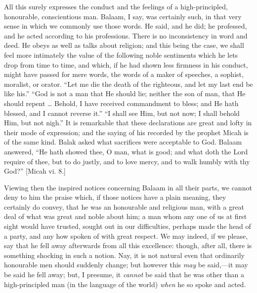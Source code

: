 All this surely expresses the conduct and the feelings of a
high-principled, honourable, conscientious man. Balaam, I say, was
certainly such, in that very sense in which we commonly use those
words. He said, and he did; he professed, and he acted according to
his professions. There is no inconsistency in word and deed. He obeys
as well as talks about religion; and this being the case, we shall
feel more intimately the value of the following noble sentiments which
he lets drop from time to time, and which, if he had shown less
firmness in his conduct, might have passed for mere words, the words
of a maker of speeches, a sophist, moralist, or orator. ``Let me
die the death of the righteous, and let my last end be like his.''
``God is not a man that He should lie; neither the son of man,
that He should repent … Behold, I have received commandment to
bless; and He hath blessed, and I cannot reverse it.'' ``I
shall see Him, but not now; I shall behold Him, but not nigh.'' It
is remarkable that these declarations are great and lofty in their
mode of expression; and the saying of his recorded by the prophet
Micah is of the same kind. Balak asked what sacrifices were acceptable
to God. Balaam answered, ``He hath showed thee, O man, what is
good; and what doth the Lord require of thee, but to do justly, and to
love mercy, and to walk humbly with thy God?'' [Micah vi. 8.]

Viewing then the inspired notices concerning Balaam in all their
parts, we cannot deny to him the praise which, if those notices have a
plain meaning, they certainly do convey, that he was an honourable and
religious man, with a great deal of what was great and noble about
him; a man whom any one of us at first sight would have trusted,
sought out in our difficulties, perhaps made the head of a party, and
any how spoken of with great respect. We may indeed, if we please, say
that he fell away afterwards from all this excellence: though, after
all, there is something shocking in such a notion. Nay, it is not
natural even that ordinarily honourable men should suddenly change;
but however this \emph{may} be said,—it may be said he fell away;
but, I presume, it \emph{cannot} be said that he was other than a
high-principled man (in the language of the world) \emph{when} he so
spoke and acted.

